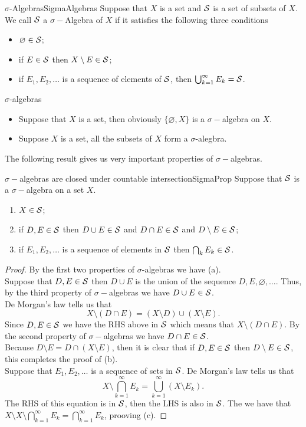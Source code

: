 \documentclass[twoside, openright, fontsize=10pt, headings=big]{scrbook}
\begin{document}
\begin{definition}{$\sigma$-Algebras}{SigmaAlgebras}
    Suppose that $X$ is a set and $\mathcal{S}$ is a set of subsets of $X$. We call $\mathcal{S}$ a $\sigma-$Algebra of $X$ if it satisfies the following three conditions
    \begin{itemize}
        \item $\varnothing\in\mathcal{S}$;
        \item if $E\in\mathcal{S}$ then $X\setminus E\in\mathcal{S}$;
        \item if $E_1,E_2,\dots$ is a sequence of elements of $\mathcal{S}$, then $\bigcup_{k=1}^\infty E_k=\mathcal{S}$.
    \end{itemize}
\end{definition}
\begin{example}{$\sigma$-algebras}{}
    \begin{itemize}
        \item Suppose that $X$ is a set, then obviously $\{\varnothing,X\}$ is a $\sigma-$algebra on $X$.
        \item Suppose $X$ is a set, all the subsets of $X$ form a $\sigma$-alegbra.
    \end{itemize}
\end{example}
The following result gives us very important properties of $\sigma-$algebras.
\begin{theorem}{$\sigma-$algebras are closed under countable intersection}{SigmaProp}
    Suppose that $\mathcal{S}$ is a $\sigma-$algebra on a set $X$.
    \begin{enumerate}[label=(\alph*)]
        \item $X\in\mathcal{S}$;
        \item if $D,E\in\mathcal{S}$ then $D\cup E\in\mathcal{S}$ and $D\cap E\in\mathcal{S}$ and $D\setminus E\in\mathcal{S}$;
        \item if $E_1,E_2,\dots$ is a sequence of elements in $\mathcal{S}$ then $\bigcap_{k}E_k\in\mathcal{S}$.
    \end{enumerate}
\end{theorem}
\begin{proof}
    By the first two properties of $\sigma$-algebras we have (a).\\
    Suppose that $D,E\in\mathcal{S}$ then $D\cup E$ is the union of the sequence $D,E,\varnothing,\dots$. Thus, by the third property of $\sigma-$algebras we have $D\cup E\in\mathcal{S}$.\\
    De Morgan's law tells us that 
    \[
        X\setminus(D\cap E)=(X\setminus D)\cup(X\setminus E).
    \]
    Since $D,E\in\mathcal{S}$ we have the RHS above in $\mathcal{S}$ which means that $X\setminus(D\cap E)$. By the second property of $\sigma-$algebras we have $D\cap E\in\mathcal{S}$.\\
    Because $D\setminus E=D\cap(X\setminus E)$, then it is clear that if $D,E\in \mathcal{S}$ then $D\setminus E\in\mathcal{S}$, this completes the proof of (b).\\
    Suppose that $E_1,E_2,\dots$ is a sequence of sets in $\mathcal{S}$. De Morgan's law tells us that 
    \[
        X\setminus\bigcap_{k=1}^{\infty}E_k=\bigcup_{k=1}^{\infty}(X\setminus E_k).
    \]
    The RHS of this equation is in $\mathcal{S}$, then the LHS is also in $\mathcal{S}$. The we have that $X\setminus X\setminus\bigcap_{k=1}^{\infty}E_k=\bigcap_{k=1}^{\infty}E_k$, prooving (c).
\end{proof}
\end{document}
